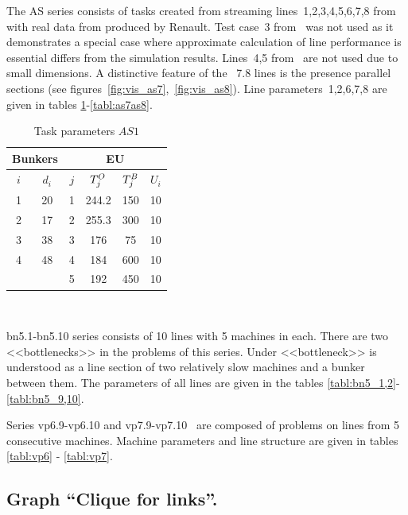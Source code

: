 \documentclass{ifacconf}
\begin{document}
The AS series consists of tasks created from streaming
lines~1,2,3,4,5,6,7,8 from~\cite{Ancelin1987} with real data from
produced by Renault.
Test case~3 from~\cite{Ancelin1987}
was not used as it demonstrates a special case where
approximate calculation of line performance is essential
differs from the simulation results.
Lines~4,5 from~\cite{Ancelin1987} are not used due to small
dimensions. A distinctive feature of the ~7.8 lines is the presence
parallel sections (see figures~\ref{fig:vis_as7},~\ref{fig:vis_as8}).
Line parameters~1,2,6,7,8 are given in tables \ref{tabl:as1}-\ref{tabl:as7as8}.

\begin{table}[h!]
\centering
\small
\begin{tabular}{||c|c||c|c|c|c||}
\hline \multicolumn{2}{||c||}{Bunkers}&\multicolumn{4}{|c||}{EU}\\
\hline
$i$ & $d_i$ & $j$ & $T^{\rm O}_j$ & $T^{\rm B}_j$ & $U_i$\\
\hline
1 & 20 & 1 & 244.2 & 150 & 10\\
2 & 17 & 2 & 255.3 & 300 & 10\\
3 & 38 & 3 & 176 & 75 & 10\\
4 & 48 & 4 & 184 & 600 & 10\\
&& 5 & 192 & 450 & 10\\
\hline
\end{tabular}\\
\caption{Task parameters $\textit{AS1}$}\label{tabl:as1}
\end{table}

bn5.1-bn5.10 series consists of 10 lines with 5 machines in
each. There are two <<bottlenecks>> in the problems of this series. Under
<<bottleneck>> is understood as a line section of two relatively slow machines and a bunker
between them. The parameters of all lines are given in the tables \ref{tabl:bn5_1,2}-\ref{tabl:bn5_9,10}.

Series vp6.9-vp6.10 and vp7.9-vp7.10~\cite{vp} are composed of problems on lines from
5 consecutive machines. Machine parameters and line structure are given in tables \ref{tabl:vp6} - \ref{tabl:vp7}.

\subsection{ Graph ``Clique for links''.}
\label{subsec:initialclique}
\end{document}
